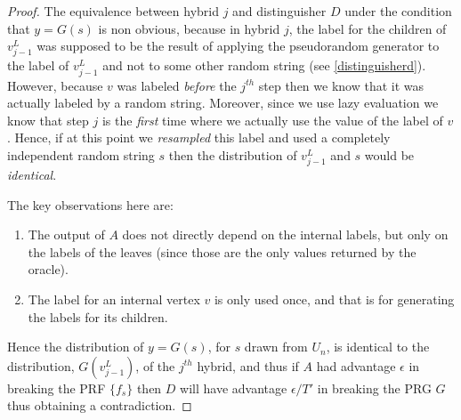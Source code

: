 \begin{proof}
The equivalence between hybrid \(j\) and distinguisher \(D\) under the
condition that \(y=G(s)\) is non obvious, because in hybrid \(j\), the
label for the children of \(v_{j-1}^{L}\) was supposed to be the result
of applying the pseudorandom generator to the label of \(v_{j-1}^{L}\)
and not to some other random string (see \cref{distinguisherd}).
However, because \(v\) was labeled \emph{before} the \(j^{th}\) step
then we know that it was actually labeled by a random string. Moreover,
since we use lazy evaluation we know that step \(j\) is the \emph{first}
time where we actually use the value of the label of \(v\). Hence, if at
this point we \emph{resampled} this label and used a completely
independent random string \(s\) then the distribution of \(v_{j-1}^{L}\)
and \(s\) would be \emph{identical}.

The key observations here are:

\begin{enumerate}
\def\labelenumi{\arabic{enumi}.}
\item
  The output of \(A\) does not directly depend on the internal labels,
  but only on the labels of the leaves (since those are the only values
  returned by the oracle).
\item
  The label for an internal vertex \(v\) is only used once, and that is
  for generating the labels for its children.
\end{enumerate}

Hence the distribution of \(y=G(s)\), for \(s\) drawn from \(U_n\), is
identical to the distribution, \(G(v_{j-1}^{L})\), of the \(j^{th}\)
hybrid, and thus if \(A\) had advantage \(\epsilon\) in breaking the PRF
\(\{ f_s \}\) then \(D\) will have advantage \(\epsilon/T'\) in breaking
the PRG \(G\) thus obtaining a contradiction.

\end{proof}

\hypertarget{prfpracticerem}{}

